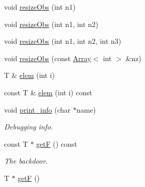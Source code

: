 \begin{DoxyCompactItemize}
\item 
void \mbox{\hyperlink{classENSEM_1_1Ensem_a20ee27dffc4b1db635103ce40fb0d5c2}{resize\+Obs}} (int n1)
\item 
void \mbox{\hyperlink{classENSEM_1_1Ensem_af74074307267e421a53a3e9e9e2449fc}{resize\+Obs}} (int n1, int n2)
\item 
void \mbox{\hyperlink{classENSEM_1_1Ensem_a8d63351cad23f2af13f26c7326d1abcf}{resize\+Obs}} (int n1, int n2, int n3)
\item 
void \mbox{\hyperlink{classENSEM_1_1Ensem_a4acf05018e5c49c0053dbe8cf76a4252}{resize\+Obs}} (const \mbox{\hyperlink{classXMLArray_1_1Array}{Array}}$<$ int $>$ \&nz)
\item 
T \& \mbox{\hyperlink{classENSEM_1_1Ensem_a4927ebde99b1f0a03cdcfe3fc88458a5}{elem}} (int i)
\item 
const T \& \mbox{\hyperlink{classENSEM_1_1Ensem_a03e45aba3d9addb16e117debbc4e1a33}{elem}} (int i) const
\item 
void \mbox{\hyperlink{classENSEM_1_1Ensem_a85302bace1110e35249c88486f88d80c}{print\+\_\+info}} (char $\ast$name)
\begin{DoxyCompactList}\small\item\em Debugging info. \end{DoxyCompactList}\item 
const T $\ast$ \mbox{\hyperlink{classENSEM_1_1Ensem_ad2cb7a34934bedeaa29f49c78cdb8371}{getF}} () const
\begin{DoxyCompactList}\small\item\em The backdoor. \end{DoxyCompactList}\item 
T $\ast$ \mbox{\hyperlink{classENSEM_1_1Ensem_ab2909a7d9b171d7e2ba7365c5e962aa6}{getF}} ()
\end{DoxyCompactItemize}
